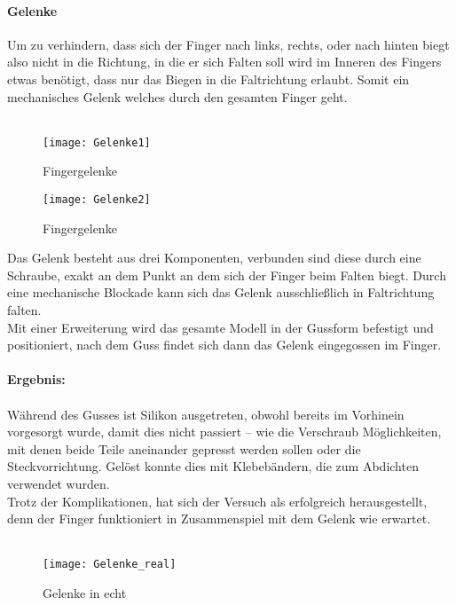 \documentclass[titlepage,12pt,twoside]{article}
\begin{document}
\paragraph{Gelenke}
\hfill \break
\hfill \break
Um zu verhindern, dass sich der Finger nach links, rechts, oder nach hinten biegt also nicht in die Richtung, in die er sich Falten soll wird im Inneren des Fingers etwas benötigt, dass nur das Biegen in die Faltrichtung erlaubt. Somit ein 
mechanisches Gelenk welches durch den gesamten Finger geht. \\
\\
\begin{figure}[H]
	\begin{center}
		\scalebox{1.2}
		{\texttt{[image: Gelenke1]}}
		\caption{Fingergelenke}
		\label{fig:Gelenke1}			
	\end{center}
\end{figure}
\begin{figure}[H]
	\begin{center}
		\scalebox{1.2}
		{\texttt{[image: Gelenke2]}}
		\caption{Fingergelenke}
		\label{fig:Gelenke2}			
	\end{center}
\end{figure}
\hfill \break
Das Gelenk besteht aus drei Komponenten, verbunden sind diese durch eine Schraube, exakt an dem Punkt an dem sich der Finger beim Falten biegt. Durch eine mechanische Blockade kann sich das Gelenk ausschließlich in Faltrichtung falten. \\
Mit einer Erweiterung wird das gesamte Modell in der Gussform befestigt und positioniert, nach dem Guss findet sich dann das Gelenk eingegossen im Finger. \\
\\
\textbf{Ergebnis:} \\
\\
Während des Gusses ist Silikon ausgetreten, obwohl bereits im Vorhinein vorgesorgt wurde, damit dies nicht passiert – wie die Verschraub Möglichkeiten, mit denen beide Teile aneinander gepresst werden sollen oder die Steckvorrichtung. 
Gelöst konnte dies mit Klebebändern, die zum Abdichten verwendet wurden. \\
Trotz der Komplikationen, hat sich der Versuch als erfolgreich herausgestellt, denn der Finger funktioniert in Zusammenspiel mit dem Gelenk wie erwartet. \\
\\
\begin{figure}[H]
	\begin{center}
		\scalebox{1.2}
		{\texttt{[image: Gelenke\_real]}}
		\caption{Gelenke in echt}
		\label{fig:Gelenke_real}			
	\end{center}
\end{figure}
\hfill \break
\end{document}
